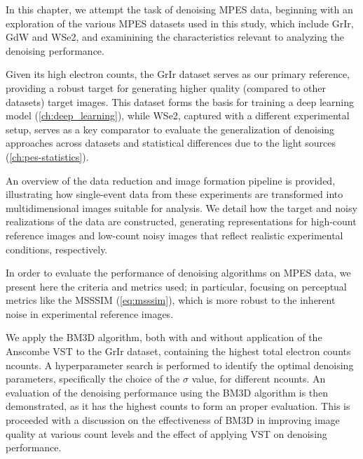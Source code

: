 In this chapter, we attempt the task of denoising \gls{MPES} data, beginning with an exploration of the various \gls{MPES} datasets used in this study, which include \gls{GrIr}, \gls{GdW} and \gls{WSe2}, and examinining the characteristics relevant to analyzing the denoising performance.

Given its high electron counts, the \gls{GrIr} dataset serves as our primary reference, providing a robust target for generating higher quality (compared to other datasets) target images. This dataset forms the basis for training a deep learning model (\cref{ch:deep_learning}), while \gls{WSe2}, captured with a different experimental setup, serves as a key comparator to evaluate the generalization of denoising approaches across datasets and statistical differences due to the light sources (\cref{ch:pes-statistics}).

An overview of the data reduction and image formation pipeline is provided, illustrating how single-event data from these experiments are transformed into multidimensional images suitable for analysis. We detail how the target and noisy realizations of the data are constructed, generating representations for high-count reference images and low-count noisy images that reflect realistic experimental conditions, respectively.

In order to evaluate the performance of denoising algorithms on \gls{MPES} data, we present here the criteria and metrics used; in particular, focusing on perceptual metrics like the \gls{MSSSIM} (\cref{eq:msssim}), which is more robust to the inherent noise in experimental reference images.

We apply the \gls{BM3D} algorithm, both with and without application of the Anscombe \gls{VST} to the \gls{GrIr} dataset, containing the highest total electron counts \gls{ncounts}. A hyperparameter search is performed to identify the optimal denoising parameters, specifically the choice of the $\sigma$ value, for different \gls{ncounts}. An evaluation of the denoising performance using the \gls{BM3D} algorithm is then demonstrated, as it has the highest counts to form an proper evaluation. This is proceeded with a discussion on the effectiveness of \gls{BM3D} in improving image quality at various count levels and the effect of applying \gls{VST} on denoising performance.



